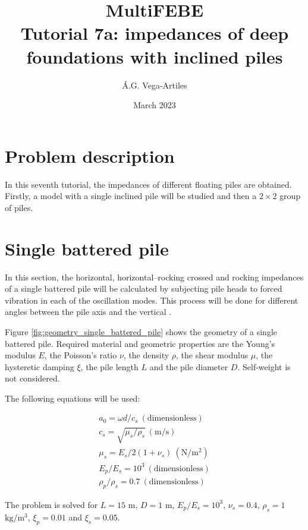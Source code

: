 \documentclass[a4]{article}
\title{MultiFEBE \\ Tutorial 7a: impedances of deep foundations with inclined piles}
\author{\'A.G. Vega-Artiles}
\date{March 2023}
\begin{document}
\maketitle

\tableofcontents 

\section{Problem description}

In this seventh tutorial, the impedances of different floating piles are obtained. Firstly, a model with a single inclined pile will be studied and then a $2 \times 2 $ group of piles. 
 
\section{Single battered pile}

In this section, the horizontal, horizontal–rocking crossed and rocking impedances of a single battered pile will be calculated by subjecting pile heads to forced vibration in each of the oscillation modes. This process will be done for different angles between the pile axis and the vertical \cite{padron}.

Figure \ref{fig:geometry_single_battered_pile} shows the geometry of a single battered pile. Required material and geometric properties are the Young's modulus $E$, the Poisson's ratio $\nu$, the density $\rho$, the shear modulus $\mu$, the hysteretic damping $\xi$, the pile length $L$ and the pile diameter $D$. Self-weight is not considered.

The following equations will be used: 

\begin{equation}
	\begin{array}{l}
		a_0 = \omega d/c_s \medspace \mathrm{(dimensionless)} \\
		c_s = \sqrt{\mu_s/\rho_s}\medspace \mathrm{(m/s)} \\
		\mu_s = E_s/2(1+\nu_s)\medspace \mathrm{(N/m^2)} \\
		E_p/E_s= 10^3 \medspace \mathrm{(dimensionless)} \\
		\rho_p/\rho_s=0.7 \medspace \mathrm{(dimensionless)}
	\end{array}
\end{equation}

The problem is solved for $L=15$ $\mathrm{m}$, $D=1$ $\mathrm{m}$, $E_p/E_s= 10^3$, $\nu_s=0.4$, $\rho_s=1$ $\mathrm{kg/m^3}$, $\xi_p=0.01$ and  $\xi_s=0.05$.
\end{document}
